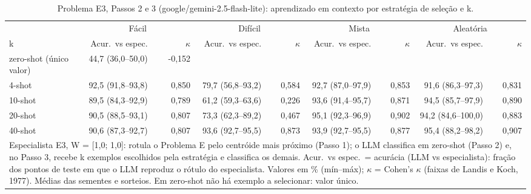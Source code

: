 \begin{table}[htbp]
\centering
\small
\caption{Problema E3, Passos 2 e 3 (google/gemini-2.5-flash-lite): aprendizado em contexto por estratégia de seleção e k.}
\label{tab:bloco2_E3_passo3_estrategia_x_k_flashlite}
\begin{tabular}{lrrrrrrrr}
\toprule
 & \multicolumn{2}{c}{Fácil} & \multicolumn{2}{c}{Difícil} & \multicolumn{2}{c}{Mista} & \multicolumn{2}{c}{Aleatória} \\ \cmidrule(lr){2-3} \cmidrule(lr){4-5} \cmidrule(lr){6-7} \cmidrule(lr){8-9}
k & Acur.\ vs espec. & $\kappa$ & Acur.\ vs espec. & $\kappa$ & Acur.\ vs espec. & $\kappa$ & Acur.\ vs espec. & $\kappa$ \\
\midrule
zero-shot (único valor) & 44,7 (36,0–50,0) & -0,152 &  &  &  &  &  &  \\
4-shot & 92,5 (91,8–93,8) & 0,850 & 79,7 (56,8–93,2) & 0,584 & 92,7 (87,0–97,9) & 0,853 & 91,6 (86,3–97,3) & 0,831 \\
10-shot & 89,5 (84,3–92,9) & 0,789 & 61,2 (59,3–63,6) & 0,226 & 93,6 (91,4–95,7) & 0,871 & 94,5 (85,7–97,9) & 0,890 \\
20-shot & 90,5 (88,5–93,1) & 0,807 & 73,3 (62,3–89,2) & 0,467 & 95,1 (92,3–96,9) & 0,902 & 94,2 (84,6–100,0) & 0,883 \\
40-shot & 90,6 (87,3–92,7) & 0,807 & 93,6 (92,7–95,5) & 0,873 & 93,9 (92,7–95,5) & 0,877 & 95,4 (88,2–98,2) & 0,907 \\
\bottomrule
\multicolumn{9}{p{0.95\linewidth}}{\footnotesize Especialista E3, W = [1,0; 1,0]: rotula o Problema E pelo centróide mais próximo (Passo 1); o LLM classifica em zero-shot (Passo 2) e, no Passo 3, recebe k exemplos escolhidos pela estratégia e classifica os demais. Acur.\ vs espec.\ = acurácia (LLM vs especialista): fração dos pontos de teste em que o LLM reproduz o rótulo do especialista. Valores em \% (mín–máx); $\kappa$ = Cohen's $\kappa$ (faixas de Landis e Koch, 1977). Médias das sementes e sorteios. Em zero-shot não há exemplo a selecionar: valor único.} \\
\end{tabular}
\end{table}
